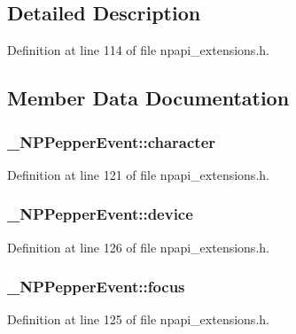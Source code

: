 \subsection{Detailed Description}


Definition at line 114 of file npapi\_\-extensions.h.



\subsection{Member Data Documentation}
\hypertarget{struct___n_p_pepper_event_afc0494334dc72989113311fa74a638ec}{
\subsubsection[{character}]{ {\bf \_\-NPPepperEvent::character}}}
\label{struct___n_p_pepper_event_afc0494334dc72989113311fa74a638ec}


Definition at line 121 of file npapi\_\-extensions.h.

\hypertarget{struct___n_p_pepper_event_ad7aeb1cb905712a3155e78d90901c151}{
\subsubsection[{device}]{ {\bf \_\-NPPepperEvent::device}}}
\label{struct___n_p_pepper_event_ad7aeb1cb905712a3155e78d90901c151}


Definition at line 126 of file npapi\_\-extensions.h.

\hypertarget{struct___n_p_pepper_event_acb9862d36b1248b68657e26c9e59624f}{
\subsubsection[{focus}]{ {\bf \_\-NPPepperEvent::focus}}}
\label{struct___n_p_pepper_event_acb9862d36b1248b68657e26c9e59624f}


Definition at line 125 of file npapi\_\-extensions.h.

